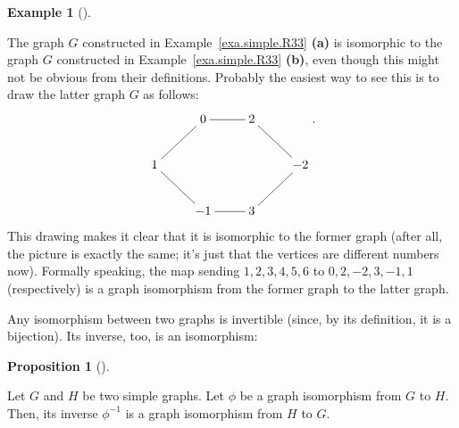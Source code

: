 \documentclass[numbers=enddot,12pt,final,onecolumn,notitlepage]{scrartcl}%
\makeatletter
\theoremstyle{definition}
\newtheorem{prop}[theo]{Proposition}
\newenvironment{proposition}[1][]
{\begin{prop}[#1]\begin{leftbar}}
{\end{leftbar}\end{prop}}
\newtheorem{exam}[theo]{Example}
\newenvironment{example}[1][]
{\begin{exam}[#1]\begin{leftbar}}
{\end{leftbar}\end{exam}}
\newcommand{\are}{\ar@{-}}
\makeatother
\begin{document}
\begin{example}
The graph $G$ constructed in Example~\ref{exa.simple.R33} \textbf{(a)}
is isomorphic to the graph $G$
constructed in Example~\ref{exa.simple.R33} \textbf{(b)}, even though
this might not be obvious from their definitions. Probably the easiest
way to see this is to draw the latter graph $G$ as follows:
\begin{align*}
\xymatrix{
& 0 \are[r] & 2 \are[rd] \\
1 \are[ru] & & & -2 \are[ld] \\
& -1 \are[lu] & 3 \are[l]
} .
\end{align*}
This drawing makes it clear that it is isomorphic to the former graph
(after all, the picture is exactly the same; it's just that the
vertices are different numbers now). Formally speaking, the map
sending $1, 2, 3, 4, 5, 6$ to $0, 2, -2, 3, -1, 1$ (respectively) is
a graph isomorphism from the former graph to the latter graph.
\end{example}

Any isomorphism between two graphs is invertible (since, by its
definition, it is a bijection). Its inverse, too, is an isomorphism:

\begin{proposition} \label{prop.intro.iso.inverse}
Let $G$ and $H$ be two simple graphs. Let $\phi$ be a graph
isomorphism from $G$ to $H$. Then, its inverse $\phi^{-1}$ is a graph
isomorphism from $H$ to $G$.
\end{proposition}
\end{document}
